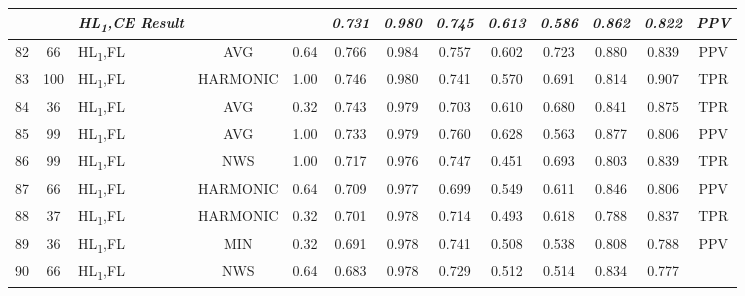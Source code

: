 \begin{table}[H]
{\begin{tabular}{cc|l|cc|c|c|c|c|c|c|c|c|}
   &
    \textit{\textbf{}} &
    \textit{\textbf{HL\textsubscript{1},CE Result}} &
     &
     &
    \textit{\textbf{0.731}} &
    \textit{\textbf{0.980}} &
    \textit{\textbf{0.745}} &
    \textit{\textbf{0.613}} &
    \textit{\textbf{0.586}} &
    \textit{\textbf{0.862}} &
    \textit{\textbf{0.822}} &
    \textit{\textbf{PPV}} \\ \hline
  \multicolumn{1}{|c|}{82} &
    66 &
    HL\textsubscript{1},FL &
    \multicolumn{1}{c|}{AVG} &
    0.64 &
    0.766 &
    0.984 &
    0.757 &
    0.602 &
    0.723 &
    0.880 &
    0.839 &
    PPV \\ \hline
  \multicolumn{1}{|c|}{83} &
    100 &
    HL\textsubscript{1},FL &
    \multicolumn{1}{c|}{HARMONIC} &
    1.00 &
    0.746 &
    0.980 &
    0.741 &
    0.570 &
    0.691 &
    0.814 &
    0.907 &
    TPR \\ \hline
  \multicolumn{1}{|c|}{84} &
    36 &
    HL\textsubscript{1},FL &
    \multicolumn{1}{c|}{AVG} &
    0.32 &
    0.743 &
    0.979 &
    0.703 &
    0.610 &
    0.680 &
    0.841 &
    0.875 &
    TPR \\ \hline
  \multicolumn{1}{|c|}{85} &
    99 &
    HL\textsubscript{1},FL &
    \multicolumn{1}{c|}{AVG} &
    1.00 &
    0.733 &
    0.979 &
    0.760 &
    0.628 &
    0.563 &
    0.877 &
    0.806 &
    PPV \\ \hline
  \multicolumn{1}{|c|}{86} &
    99 &
    HL\textsubscript{1},FL &
    \multicolumn{1}{c|}{NWS} &
    1.00 &
    0.717 &
    0.976 &
    0.747 &
    0.451 &
    0.693 &
    0.803 &
    0.839 &
    TPR \\ \hline
  \multicolumn{1}{|c|}{87} &
    66 &
    HL\textsubscript{1},FL &
    \multicolumn{1}{c|}{HARMONIC} &
    0.64 &
    0.709 &
    0.977 &
    0.699 &
    0.549 &
    0.611 &
    0.846 &
    0.806 &
    PPV \\ \hline
  \multicolumn{1}{|c|}{88} &
    37 &
    HL\textsubscript{1},FL &
    \multicolumn{1}{c|}{HARMONIC} &
    0.32 &
    0.701 &
    0.978 &
    0.714 &
    0.493 &
    0.618 &
    0.788 &
    0.837 &
    TPR \\ \hline
  \multicolumn{1}{|c|}{89} &
    36 &
    HL\textsubscript{1},FL &
    \multicolumn{1}{c|}{MIN} &
    0.32 &
    0.691 &
    0.978 &
    0.741 &
    0.508 &
    0.538 &
    0.808 &
    0.788 &
    PPV \\ \hline
  \multicolumn{1}{|c|}{90} &
    66 &
    HL\textsubscript{1},FL &
    \multicolumn{1}{c|}{NWS} &
    0.64 &
    0.683 &
    0.978 &
    0.729 &
    0.512 &
    0.514 &
    0.834 &
    0.777 &

\end{tabular}}
\end{table}
